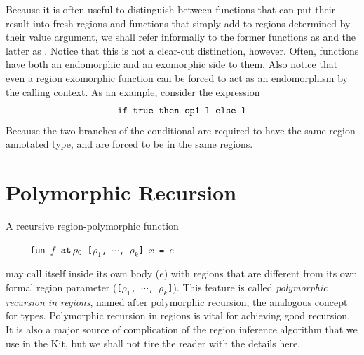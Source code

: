 \documentclass[12pt]{book}
\begin{document}
Because it is often useful to distinguish between functions that can
put their result into fresh regions and functions that simply add to
regions determined by their value argument, we shall refer informally
to the former functions as  and the latter as . Notice that this is not a clear-cut 
distinction, however. Often, functions have both an endomorphic and an
exomorphic side to them. Also notice that even a region exomorphic
function can be forced to act as an endomorphism by the calling
context. As an example, consider the expression
$$\hbox{\tt if true then cp1 l else l}$$
Because the two branches of the conditional are required to have the same region-annotated
type,  and  are forced to be in the same regions.
%
\section{Polymorphic Recursion}
%
\label{polyrec.sec}
A recursive region-polymorphic function
\begin{tabbing}
\ \ \ \ \ \=\tt fun $f$ $\mathbin{\hbox{\tt at}}\,\rho_0$ [$\rho_1$, $\cdots$, $\rho_k$] $x$ = $e$
\end{tabbing}
may call itself inside its own body ($e$) with regions that are different
from its own formal region parameter ({\tt [$\rho_1$, $\cdots$, $\rho_k$]}).
This feature is called {\it polymorphic recursion in regions}, named after
polymorphic recursion, the analogous concept for types.
Polymorphic recursion in regions is vital for achieving good recursion.
It is also a major source of  complication of the region inference algorithm
that we use in the Kit, but we shall not tire the reader with the details here.
\end{document}
